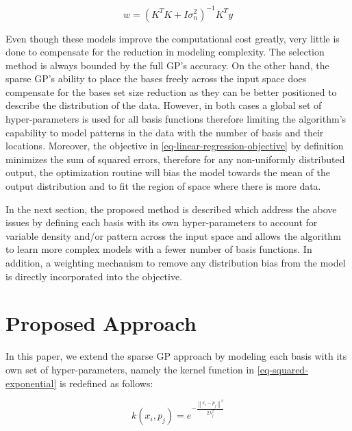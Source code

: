 \documentclass[useAMS,usenatbib,fleqn]{mn2e}
\begin{document}
\begin{equation}
\label{eq-linear-regression-objective-rectangular}
w = \left(K^{T}K+I\sigma_{n}^{2} \right)^{-1}K^{T}y
\end{equation}

Even though these models improve the computational cost greatly, very little is done to compensate for the reduction in modeling complexity. The selection method is always bounded by the full GP's accuracy. On the other hand, the sparse GP's ability to place the bases freely across the input space does compensate for the bases set size reduction as they can be better positioned to describe the distribution of the data. However, in both cases a global set of hyper-parameters is used for all basis functions therefore limiting the algorithm's capability to model patterns in the data with the number of basis and their locations. Moreover, the objective in \eqref{eq-linear-regression-objective} by definition minimizes the sum of squared errors, therefore for any non-uniformly distributed output, the optimization routine will bias the model towards the mean of the output distribution and to fit the region of space where there is more data.

In the next section, the proposed method is described which address the above issues by defining each basis with its own hyper-parameters to account for variable density and/or pattern across the input space and allows the algorithm to learn more complex models with a fewer number of basis functions. In addition, a weighting mechanism to remove any distribution bias from the model is directly incorporated into the objective.

\section{Proposed Approach}
\label{sec-proposed-approach}

In this paper, we extend the sparse GP approach by modeling each basis with its own set of hyper-parameters, namely the kernel function in \eqref{eq-squared-exponential} is redefined as follows:

\begin{equation}
\label{eq-squared-exponential-extension}
k(x_{i},p_{j}) = e^{-\frac{\left\| x_{i}-p_{j}\right\|^{2}}{2\lambda_{j}^{2}}}
\end{equation}
\end{document}
